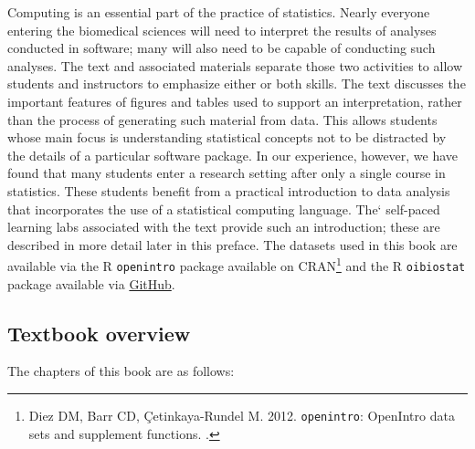 Computing is an essential part of the practice of statistics.  Nearly everyone entering the biomedical sciences will need to interpret the results of analyses conducted in software; many will also need to be capable of conducting such analyses. The text and associated materials separate those two activities to allow students and instructors to emphasize either or both skills. The text discusses the important features of figures and tables used to support an interpretation, rather than the process of generating such material from data. This allows students whose main focus is understanding statistical concepts not to be distracted by the details of a particular software package. In our experience, however, we have found that many students enter a research setting after only a single course in statistics. These students benefit from a practical introduction to data analysis that incorporates the use of a statistical computing language. The` self-paced learning labs associated with the text provide such an introduction; these are described in more detail later in this preface. The datasets used in this book are available via the \textsf{R} \texttt{openintro} package available on CRAN\footnote{Diez DM, Barr CD, \c{C}etinkaya-Rundel M. 2012. \texttt{openintro}: OpenIntro data sets and supplement functions. .}  and the \textsf{R} \texttt{oibiostat} package available via \href{https://github.com/OI-Biostat/oi_biostat_data}{GitHub}.

\subsection*{Textbook overview}

The chapters of this book are as follows:

